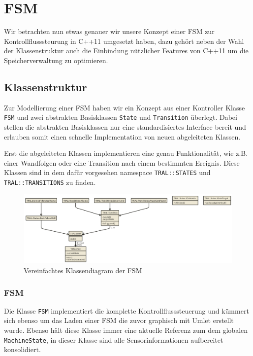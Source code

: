 \section{FSM}
\label{sec:fsm}
Wir betrachten nun etwas genauer wir unsere Konzept einer FSM zur 
Kontrollflusssteurung in C++11 umgesetzt haben, dazu gehört neben der Wahl 
der Klassenstruktur auch die Einbindung nützlicher Features von C++11 um die
Speicherverwaltung zu optimieren.


\subsection{Klassenstruktur}
Zur Modellierung einer FSM haben wir ein Konzept aus einer Kontroller Klasse \texttt{FSM} und zwei abstrakten Basisklassen \texttt{State} und \texttt{Transition} überlegt. Dabei stellen die abstrakten Basisklassen nur eine standardisiertes Interface bereit und erlauben somit einen schnelle Implementation von neuen abgeleiteten Klassen.


Erst die abgeleiteten Klassen implementieren eine genau Funktionalität, wie z.B. einer Wandfolgen oder eine Transition nach einem bestimmten Ereignis. Diese Klassen sind in dem dafür vorgesehen namespace \texttt{TRAL::STATES} und \texttt{TRAL::TRANSITIONS} zu finden.

\begin{figure}[htbp] 
  \centering
     \includegraphics[width=\textwidth]{images/fsm-uml.png}
  \caption{Vereinfachtes Klassendiagram der FSM}
  \label{fig:KlassendiagramFSM}
\end{figure}

\subsubsection{FSM}
Die Klasse \texttt{FSM} implementiert die komplette Kontrollflusssteuerung und kümmert sich ebenso um das Laden einer FSM die zuvor graphisch mit Umlet erstellt wurde. Ebenso hält diese Klasse immer eine aktuelle Referenz zum dem globalen \texttt{MachineState}, in dieser Klasse sind alle Sensorinformationen aufbereitet konsolidiert.

